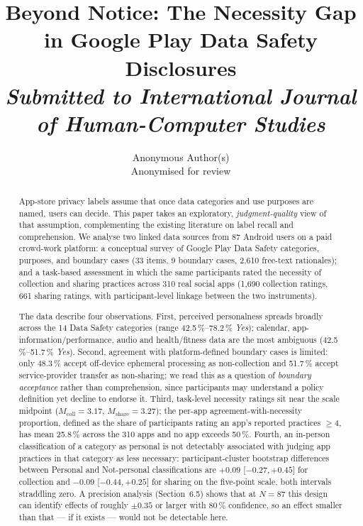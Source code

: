 \documentclass[11pt,a4paper]{article}
\title{\textbf{Beyond Notice: The Necessity Gap in Google Play Data Safety
Disclosures}\\[4pt]
\large \textit{Submitted to International Journal of Human-Computer Studies}}
\author{Anonymous Author(s)\\\small Anonymised for review}
\date{}
\begin{document}
\maketitle

\begin{abstract}\normalsize
App-store privacy labels assume that once data categories and use
purposes are named, users can decide. This paper takes an exploratory,
\emph{judgment-quality} view of that assumption, complementing the
existing literature on label recall and comprehension. We analyse two
linked data sources from 87 Android users on a paid crowd-work platform:
a conceptual survey of Google Play Data Safety categories, purposes,
and boundary cases (33 items, 9 boundary cases, 2{,}610 free-text
rationales); and a task-based assessment in which the same participants
rated the necessity of collection and sharing practices across 310 real
social apps (1{,}690 collection ratings, 661 sharing ratings, with
participant-level linkage between the two instruments).

The data describe four observations. First, perceived personalness
spreads broadly across the 14 Data Safety categories (range
42.5\,\%--78.2\,\% \emph{Yes}); calendar, app-information/performance,
audio and health/fitness data are the most ambiguous
(42.5\,\%--51.7\,\% \emph{Yes}). Second, agreement with
platform-defined boundary cases is limited: only 48.3\,\% accept
off-device ephemeral processing as non-collection and 51.7\,\% accept
service-provider transfer as non-sharing; we read this as a question of
\emph{boundary acceptance} rather than comprehension, since
participants may understand a policy definition yet decline to endorse
it. Third, task-level necessity ratings sit near the scale midpoint
($M_{\text{coll}}=3.17$, $M_{\text{share}}=3.27$); the per-app
agreement-with-necessity proportion, defined as the share of
participants rating an app's reported practices $\geq 4$, has mean
25.8\,\% across the 310 apps and no app exceeds 50\,\%. Fourth, an
in-person classification of a category as personal is not detectably
associated with judging app practices in that category as less
necessary: participant-cluster bootstrap differences between Personal
and Not-personal classifications are
$+0.09$ {[$-0.27$,\,$+0.45$]} for collection and
$-0.09$ {[$-0.44$,\,$+0.25$]} for sharing on the five-point scale,
both intervals straddling zero. A precision analysis (Section~6.5)
shows that at $N=87$ this design can identify effects of roughly
$\pm 0.35$ or larger with 80\,\% confidence, so an effect smaller than
that --- if it exists --- would not be detectable here.


\end{abstract}
\end{document}
